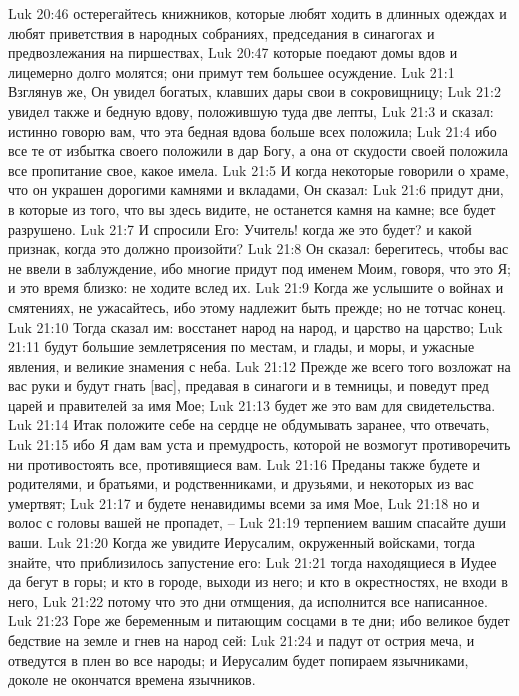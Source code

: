 Luk 20:46  остерегайтесь книжников, которые любят ходить в длинных одеждах и любят приветствия в народных собраниях, председания в синагогах и предвозлежания на пиршествах,
Luk 20:47  которые поедают домы вдов и лицемерно долго молятся; они примут тем большее осуждение.
Luk 21:1  Взглянув же, Он увидел богатых, клавших дары свои в сокровищницу;
Luk 21:2  увидел также и бедную вдову, положившую туда две лепты,
Luk 21:3  и сказал: истинно говорю вам, что эта бедная вдова больше всех положила;
Luk 21:4  ибо все те от избытка своего положили в дар Богу, а она от скудости своей положила все пропитание свое, какое имела.
Luk 21:5  И когда некоторые говорили о храме, что он украшен дорогими камнями и вкладами, Он сказал:
Luk 21:6  придут дни, в которые из того, что вы здесь видите, не останется камня на камне; все будет разрушено.
Luk 21:7  И спросили Его: Учитель! когда же это будет? и какой признак, когда это должно произойти?
Luk 21:8  Он сказал: берегитесь, чтобы вас не ввели в заблуждение, ибо многие придут под именем Моим, говоря, что это Я; и это время близко: не ходите вслед их.
Luk 21:9  Когда же услышите о войнах и смятениях, не ужасайтесь, ибо этому надлежит быть прежде; но не тотчас конец.
Luk 21:10  Тогда сказал им: восстанет народ на народ, и царство на царство;
Luk 21:11  будут большие землетрясения по местам, и глады, и моры, и ужасные явления, и великие знамения с неба.
Luk 21:12  Прежде же всего того возложат на вас руки и будут гнать [вас], предавая в синагоги и в темницы, и поведут пред царей и правителей за имя Мое;
Luk 21:13  будет же это вам для свидетельства.
Luk 21:14  Итак положите себе на сердце не обдумывать заранее, что отвечать,
Luk 21:15  ибо Я дам вам уста и премудрость, которой не возмогут противоречить ни противостоять все, противящиеся вам.
Luk 21:16  Преданы также будете и родителями, и братьями, и родственниками, и друзьями, и некоторых из вас умертвят;
Luk 21:17  и будете ненавидимы всеми за имя Мое,
Luk 21:18  но и волос с головы вашей не пропадет, --
Luk 21:19  терпением вашим спасайте души ваши.
Luk 21:20  Когда же увидите Иерусалим, окруженный войсками, тогда знайте, что приблизилось запустение его:
Luk 21:21  тогда находящиеся в Иудее да бегут в горы; и кто в городе, выходи из него; и кто в окрестностях, не входи в него,
Luk 21:22  потому что это дни отмщения, да исполнится все написанное.
Luk 21:23  Горе же беременным и питающим сосцами в те дни; ибо великое будет бедствие на земле и гнев на народ сей:
Luk 21:24  и падут от острия меча, и отведутся в плен во все народы; и Иерусалим будет попираем язычниками, доколе не окончатся времена язычников.
